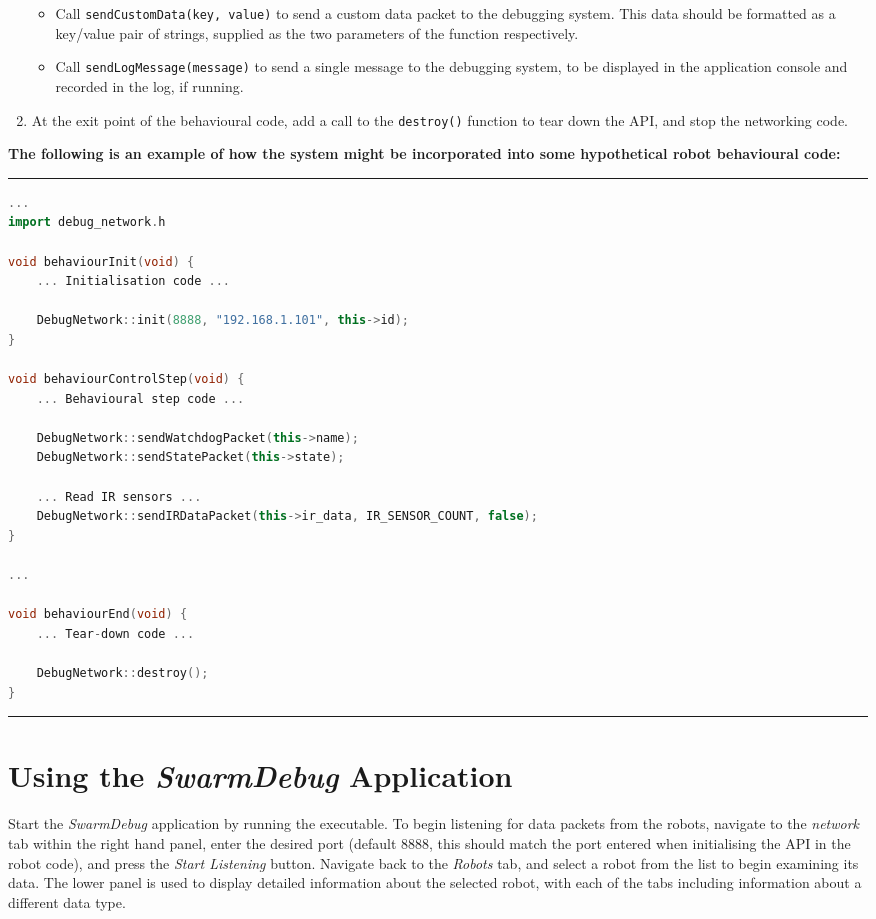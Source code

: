 \begin{enumerate}
\begin{itemize}
  \item Call \texttt{sendCustomData(key, value)} to send a custom data packet to the debugging system. This data should be formatted as a key/value pair of strings, supplied as the two parameters of the function respectively.
  \item Call \texttt{sendLogMessage(message)} to send a single message to the debugging system, to be displayed in the application console and recorded in the log, if running.
 \end{itemize}
 \item At the exit point of the behavioural code, add a call to the \texttt{destroy()} function to tear down the API, and stop the networking code.
\end{enumerate}

\noindent \textbf{The following is an example of how the system might be incorporated into some hypothetical robot behavioural code:}

\noindent \rule{\textwidth}{0.4pt}
\begin{lstlisting}[language=c++, basicstyle=\small]
...
import debug_network.h

void behaviourInit(void) {
    ... Initialisation code ...
    
    DebugNetwork::init(8888, "192.168.1.101", this->id);
}

void behaviourControlStep(void) {
	... Behavioural step code ...
	
	DebugNetwork::sendWatchdogPacket(this->name);
	DebugNetwork::sendStatePacket(this->state);
	
	... Read IR sensors ... 
	DebugNetwork::sendIRDataPacket(this->ir_data, IR_SENSOR_COUNT, false);
}

...

void behaviourEnd(void) {
	... Tear-down code ...
	
	DebugNetwork::destroy();
}
\end{lstlisting}
\rule{\textwidth}{0.4pt}

\section{Using the \textit{SwarmDebug} Application}

Start the \textit{SwarmDebug} application by running the executable. To begin listening for data packets from the robots, navigate to the \textit{network} tab within the right hand panel, enter the desired port (default 8888, this should match the port entered when initialising the API in the robot code), and press the \textit{Start Listening} button. Navigate back to the \textit{Robots} tab, and select a robot from the list to begin examining its data. The lower panel is used to display detailed information about the selected robot, with each of the tabs including information about a different data type.

